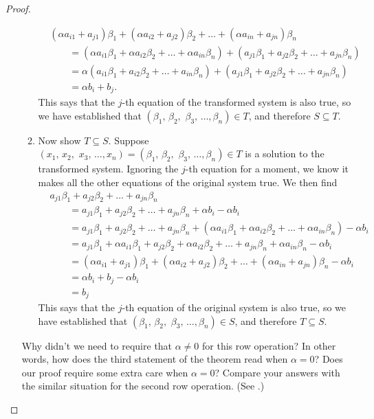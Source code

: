 \begin{proof}
\begin{enumerate}
\begin{enumerate}
%
\begin{align*}
%
&(\alpha a_{i1}+a_{j1})\beta_1+(\alpha a_{i2}+a_{j2})\beta_2+\dots+(\alpha a_{in}+a_{jn})\beta_n\\
%
&\quad\quad=(\alpha a_{i1}\beta_1+\alpha a_{i2}\beta_2+\dots+\alpha a_{in}\beta_n)+
(a_{j1}\beta_1+a_{j2}\beta_2+\dots+a_{jn}\beta_n)\\
%
&\quad\quad=\alpha(a_{i1}\beta_1+a_{i2}\beta_2+\dots+a_{in}\beta_n)+
(a_{j1}\beta_1+a_{j2}\beta_2+\dots+a_{jn}\beta_n)\\
&\quad\quad=\alpha b_i+b_j.
\end{align*}
%
This says that the $j$-th equation of the transformed system is also true, so we have established that $(\beta_1,\,\beta_2,\,\,\beta_3,\,\ldots,\beta_n)\in T$, and therefore $S\subseteq T$.
%
\item Now show $T\subseteq S$.  Suppose $(x_1,\,x_2,\,\,x_3,\,\ldots,x_n)=(\beta_1,\,\beta_2,\,\,\beta_3,\,\ldots,\beta_n)\in T$ is a solution to the transformed system.  Ignoring the $j$-th equation for a moment, we know it makes all the other equations of the original system true.  We then find
%
\begin{align*}
&a_{j1}\beta_1+a_{j2}\beta_2+\dots+a_{jn}\beta_n\\
%
&\quad\quad=a_{j1}\beta_1+a_{j2}\beta_2+\dots+a_{jn}\beta_n +\alpha b_i -\alpha b_i\\
%
&\quad\quad=a_{j1}\beta_1+a_{j2}\beta_2+\dots+a_{jn}\beta_n +(\alpha a_{i1}\beta_1+\alpha a_{i2}\beta_2+\dots+\alpha a_{in}\beta_n) -\alpha b_i\\
%
&\quad\quad=a_{j1}\beta_1+\alpha a_{i1}\beta_1+ a_{j2}\beta_2+\alpha a_{i2}\beta_2+ \dots+ a_{jn}\beta_n+\alpha a_{in}\beta_n-\alpha b_i\\
%
&\quad\quad=(\alpha a_{i1}+a_{j1})\beta_1+(\alpha a_{i2}+a_{j2})\beta_2+\dots+(\alpha a_{in}+a_{jn})\beta_n -\alpha b_i\\
%
&\quad\quad=\alpha b_i + b_j -\alpha b_i\\
%
&\quad\quad=b_j
%
\end{align*}
%
This says that the $j$-th equation of the original system is also true, so we have established that $(\beta_1,\,\beta_2,\,\,\beta_3,\,\ldots,\beta_n)\in S$, and therefore $T\subseteq S$.
%
\end{enumerate}
Why didn't we need to require that $\alpha\neq 0$ for this row operation?  In other words, how does the third statement of the theorem read when $\alpha=0$?  Does our proof require some extra care when $\alpha=0$?  Compare your answers with the similar situation for the second row operation.  (See .)
\end{enumerate}
%
\end{proof}
